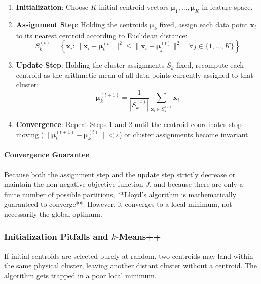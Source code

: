 \begin{enumerate}
    \item \textbf{Initialization}: Choose $K$ initial centroid vectors $\boldsymbol{\mu}_1, \dots, \boldsymbol{\mu}_K$ in feature space.
    \item \textbf{Assignment Step}: Holding the centroids $\boldsymbol{\mu}_k$ fixed, assign each data point $\mathbf{x}_i$ to its nearest centroid according to Euclidean distance:
    \begin{equation}
    S_k^{(t)} = \left\{ \mathbf{x}_i : \|\mathbf{x}_i - \boldsymbol{\mu}_k^{(t)}\|^2 \le \|\mathbf{x}_i - \boldsymbol{\mu}_j^{(t)}\|^2 \quad \forall j \in \{1, \dots, K\} \right\}\label{eq:kmeans_assignment}
    \end{equation}
    \item \textbf{Update Step}: Holding the cluster assignments $S_k$ fixed, recompute each centroid as the arithmetic mean of all data points currently assigned to that cluster:
    \begin{equation}
    \boldsymbol{\mu}_k^{(t+1)} = \frac{1}{|S_k^{(t)}|} \sum_{\mathbf{x}_i \in S_k^{(t)}} \mathbf{x}_i\label{eq:kmeans_update}
    \end{equation}
    \item \textbf{Convergence}: Repeat Steps 1 and 2 until the centroid coordinates stop moving ($\|\boldsymbol{\mu}_k^{(t+1)} - \boldsymbol{\mu}_k^{(t)}\| < \varepsilon$) or cluster assignments become invariant.
\end{enumerate}

\paragraph{Convergence Guarantee}
Because both the assignment step and the update step strictly decrease or maintain the non-negative objective function $J$, and because there are only a finite number of possible partitions, **Lloyd's algorithm is mathematically guaranteed to converge**. However, it converges to a local minimum, not necessarily the global optimum.

\subsubsection{Initialization Pitfalls and $k$-Means++}
If initial centroids are selected purely at random, two centroids may land within the same physical cluster, leaving another distant cluster without a centroid. The algorithm gets trapped in a poor local minimum.

